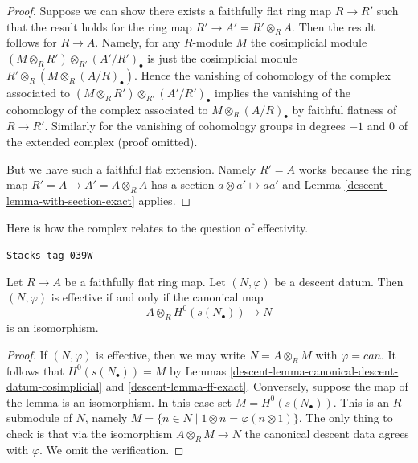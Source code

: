 \begin{proof}

Suppose we can show there exists a faithfully flat ring map
$R \to R'$ such that the result holds for the ring map
$R' \to A' = R' \otimes_R A$. Then the result follows for
$R \to A$. Namely, for any $R$-module $M$ the cosimplicial
module $(M \otimes_R R') \otimes_{R'} (A'/R')_\bullet$ is
just the cosimplicial module $R' \otimes_R (M \otimes_R (A/R)_\bullet)$.
Hence the vanishing of cohomology of the complex associated to
$(M \otimes_R R') \otimes_{R'} (A'/R')_\bullet$ implies the
vanishing of the cohomology of the complex associated to
$M \otimes_R (A/R)_\bullet$ by faithful flatness of $R \to R'$.
Similarly for the vanishing of cohomology groups in degrees
$-1$ and $0$ of the extended complex (proof omitted).

\medskip\noindent
But we have such a faithful flat extension. Namely $R' = A$ works
because the ring map $R' = A \to A' = A \otimes_R A$ has a section
$a \otimes a' \mapsto aa'$ and
Lemma \ref{descent-lemma-with-section-exact}
applies.
\end{proof}

Here is how the complex relates to the question of effectivity.

\begin{lemma}
\label{descent-lemma-recognize-effective}
\href{https://stacks.math.columbia.edu/tag/039W}{\texttt{Stacks tag 039W}}

Let $R \to A$ be a faithfully flat ring map.
Let $(N, \varphi)$ be a descent datum.
Then $(N, \varphi)$ is effective if and only if the canonical
map
$$
A \otimes_R H^0(s(N_\bullet)) \longrightarrow N
$$
is an isomorphism.
\end{lemma}

\begin{proof}

If $(N, \varphi)$ is effective, then we may write $N = A \otimes_R M$
with $\varphi = can$. It follows that $H^0(s(N_\bullet)) = M$ by
Lemmas \ref{descent-lemma-canonical-descent-datum-cosimplicial}
and \ref{descent-lemma-ff-exact}. Conversely, suppose the map of the lemma
is an isomorphism. In this case set $M = H^0(s(N_\bullet))$.
This is an $R$-submodule of $N$,
namely $M = \{n \in N \mid 1 \otimes n = \varphi(n \otimes 1)\}$.
The only thing to check is that via the isomorphism
$A \otimes_R M \to N$
the canonical descent data agrees with $\varphi$.
We omit the verification.
\end{proof}


